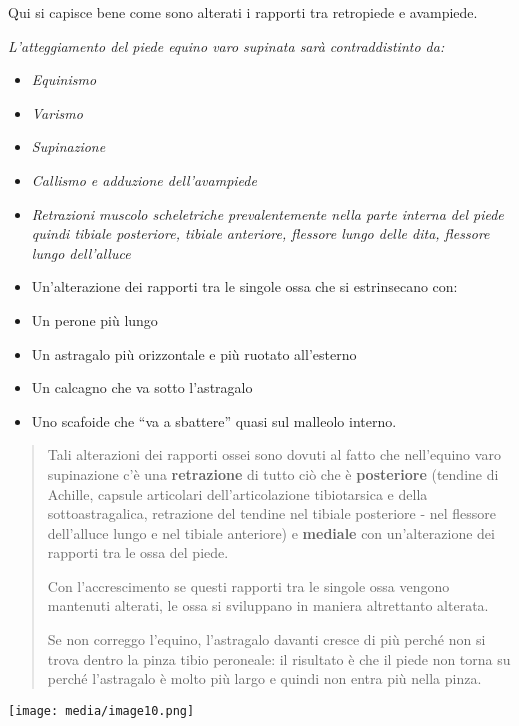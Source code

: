 \documentclass[]{article}
\begin{document}
Qui si capisce bene come sono alterati i rapporti tra retropiede e
avampiede.

\emph{L'atteggiamento del piede equino varo supinata sarà
contraddistinto da:}

\begin{itemize}
\item
  \emph{Equinismo}
\item
  \emph{Varismo}
\item
  \emph{Supinazione}
\item
  \emph{Callismo e adduzione dell'avampiede}
\item
  \emph{Retrazioni muscolo scheletriche prevalentemente nella parte
  interna del piede quindi tibiale posteriore, tibiale anteriore,
  flessore lungo delle dita, flessore lungo dell'alluce}
\item
  Un'alterazione dei rapporti tra le singole ossa che si estrinsecano
  con:
\end{itemize}

\begin{itemize}
\item
  Un perone più lungo
\item
  Un astragalo più orizzontale e più ruotato all'esterno
\item
  Un calcagno che va sotto l'astragalo
\item
  Uno scafoide che ``va a sbattere'' quasi sul malleolo interno.
\end{itemize}

\begin{quote}
Tali alterazioni dei rapporti ossei sono dovuti al fatto che nell'equino
varo supinazione c'è una \textbf{retrazione} di tutto ciò che è
\textbf{posteriore} (tendine di Achille, capsule articolari
dell'articolazione tibiotarsica e della sottoastragalica, retrazione del
tendine nel tibiale posteriore - nel flessore dell'alluce lungo e nel
tibiale anteriore) e \textbf{mediale} con un'alterazione dei rapporti
tra le ossa del piede.

Con l'accrescimento se questi rapporti tra le singole ossa vengono
mantenuti alterati, le ossa si sviluppano in maniera altrettanto
alterata.

Se non correggo l'equino, l'astragalo davanti cresce di più perché non
si trova dentro la pinza tibio peroneale: il risultato è che il piede
non torna su perché l'astragalo è molto più largo e quindi non entra più
nella pinza.
\end{quote}

\texttt{[image: media/image10.png]}
\end{document}
